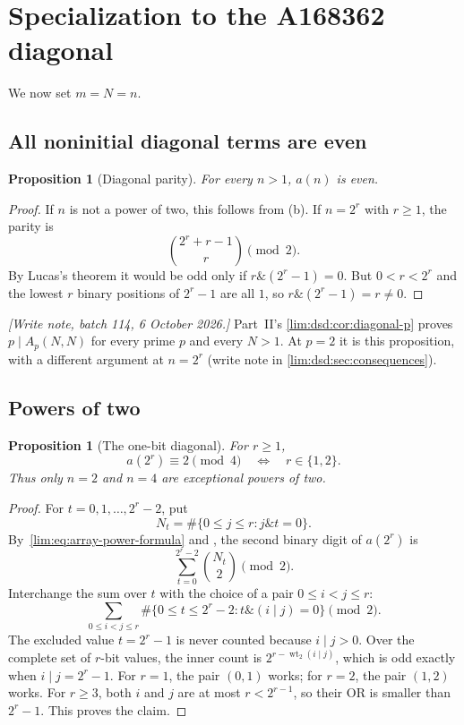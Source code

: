 \documentclass[11pt]{article}
\newtheorem{proposition}[theorem]{Proposition}
\theoremstyle{definition}
\theoremstyle{remark}
\newcommand{\wt}{\operatorname{wt}_2}
\newcommand{\band}{\mathbin{\&}}
\newcommand{\bor}{\mathbin{\vert}}
\begin{document}
\section{Specialization to the A168362 diagonal}

We now set $m=N=n$.

\subsection{All noninitial diagonal terms are even}

\begin{proposition}[Diagonal parity]
\label{lim:prop:diagonal-even}
For every $n>1$, $a(n)$ is even.
\end{proposition}

\begin{proof}
If $n$ is not a power of two, this follows from
(b).  If $n=2^r$ with $r\ge1$, the parity is
\[
 \binom{2^r+r-1}{r}\pmod2.
\]
By Lucas's theorem it would be odd only if $r\band(2^r-1)=0$.  But
$0<r<2^r$ and the lowest $r$ binary positions of $2^r-1$ are all $1$, so
$r\band(2^r-1)=r\ne0$.
\end{proof}

\emph{[Write note, batch 114, 6 October 2026.]} Part~II's \cref{lim:dsd:cor:diagonal-p} proves
$p\mid A_p(N,N)$ for every prime $p$ and every $N>1$. At $p=2$ it is this
proposition, with a different argument at $n=2^r$ (write note in
\cref{lim:dsd:sec:consequences}).

\subsection{Powers of two}

\begin{proposition}[The one-bit diagonal]
\label{lim:prop:power-diagonal}
For $r\ge1$,
\[
  a(2^r)\equiv2\pmod4
  \quad\Longleftrightarrow\quad r\in\{1,2\}.
\]
Thus only $n=2$ and $n=4$ are exceptional powers of two.
\end{proposition}

\begin{proof}
For $t=0,1,\ldots,2^r-2$, put
\[
 N_t=\#\{0\le j\le r:j\band t=0\}.
\]
By~\eqref{lim:eq:array-power-formula} and , the second
binary digit of $a(2^r)$ is
\[
 \sum_{t=0}^{2^r-2}\binom{N_t}{2}\pmod2.
\]
Interchange the sum over $t$ with the choice of a pair $0\le i<j\le r$:
\begin{equation}\label{lim:eq:power-pair-swap}
 \sum_{0\le i<j\le r}
 \#\{0\le t\le2^r-2:t\band(i\bor j)=0\}\pmod2.
\end{equation}
The excluded value $t=2^r-1$ is never counted because $i\bor j>0$.
Over the complete set of $r$-bit values, the inner count is
$2^{r-\wt(i\bor j)}$, which is odd exactly when $i\bor j=2^r-1$.
For $r=1$, the pair $(0,1)$ works; for $r=2$, the pair $(1,2)$ works.  For
$r\ge3$, both $i$ and $j$ are at most $r<2^{r-1}$, so their OR is smaller
than $2^r-1$.  This proves the claim.
\end{proof}
\end{document}
